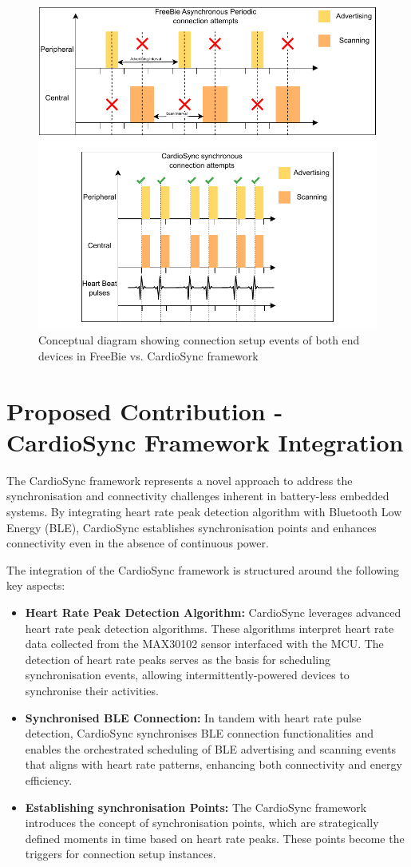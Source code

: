 \begin{figure}[H]
    \centering
    \includegraphics[width=0.6\linewidth]{chapters/Architecture/Freebie Vs. CardioSync.pdf}
    \caption{Conceptual diagram showing connection setup events of both end devices in FreeBie vs. CardioSync framework}
    \label{fig:freebie_vs_cardiosync}
\end{figure}

\section{Proposed Contribution - CardioSync Framework Integration}
The CardioSync framework represents a novel approach to address the synchronisation and connectivity challenges inherent in battery-less embedded systems. By integrating heart rate peak detection algorithm with Bluetooth Low Energy (BLE), CardioSync establishes synchronisation points and enhances connectivity even in the absence of continuous power.

\noindent The integration of the CardioSync framework is structured around the following key aspects:

\begin{itemize}
    \item \textbf{Heart Rate Peak Detection Algorithm:} CardioSync leverages advanced heart rate peak detection algorithms. These algorithms interpret heart rate data collected from the MAX30102 sensor interfaced with the MCU. The detection of heart rate peaks serves as the basis for scheduling synchronisation events, allowing intermittently-powered devices to synchronise their activities.
    
    \item \textbf{Synchronised BLE Connection:} In tandem with heart rate pulse detection, CardioSync synchronises BLE connection functionalities and enables the orchestrated scheduling of BLE advertising and scanning events that aligns with heart rate patterns, enhancing both connectivity and energy efficiency.
    
    \item \textbf{Establishing synchronisation Points:} The CardioSync framework introduces the concept of synchronisation points, which are strategically defined moments in time based on heart rate peaks. These points become the triggers for connection setup instances.
        
\end{itemize}

